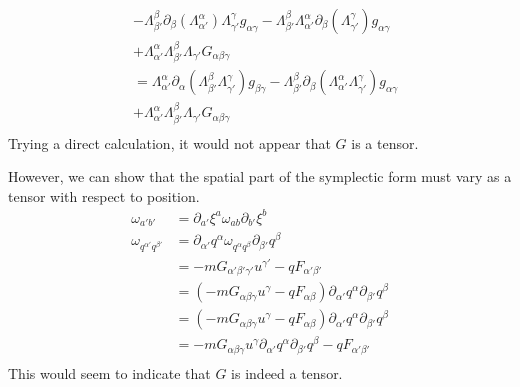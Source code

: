 \documentclass[11pt]{article}
\begin{document}
\begin{equation*}
\begin{aligned}
		&-\Lambda_{\beta'}^{\beta}\partial_{\beta}\left(\Lambda_{\alpha'}^{\alpha}\right)\Lambda_{\gamma'}^{\gamma}g_{\alpha\gamma} - \Lambda_{\beta'}^{\beta}\Lambda_{\alpha'}^{\alpha}\partial_{\beta}\left(\Lambda_{\gamma'}^{\gamma}\right)g_{\alpha\gamma}\\
		&+\Lambda_{\alpha'}^{\alpha}\Lambda_{\beta'}^{\beta}\Lambda_{\gamma'} G_{\alpha\beta\gamma} \\
		&=\Lambda_{\alpha'}^{\alpha}\partial_{\alpha}\left(\Lambda_{\beta'}^{\beta}\Lambda_{\gamma'}^{\gamma}\right)g_{\beta\gamma} -\Lambda_{\beta'}^{\beta}\partial_{\beta}\left(\Lambda_{\alpha'}^{\alpha}\Lambda_{\gamma'}^{\gamma}\right)g_{\alpha\gamma} \\
		&+\Lambda_{\alpha'}^{\alpha}\Lambda_{\beta'}^{\beta}\Lambda_{\gamma'} G_{\alpha\beta\gamma} \\
	\end{aligned}
\end{equation*}
Trying a direct calculation, it would not appear that $G$ is a tensor.

However, we can show that the spatial part of the symplectic form must
vary as a tensor with respect to position.
\begin{equation*}
	\begin{aligned}
		\omega_{a'b'} &= \partial_{a'}\xi^a \omega_{ab} \partial_{b'}\xi^b \\
		\omega_{q^{\alpha'}q^{\beta'}} &= \partial_{\alpha'}q^\alpha \omega_{q^{\alpha}q^{\beta}} \partial_{\beta'}q^\beta \\
		&=- m G_{\alpha'\beta'\gamma'} u^{\gamma'} - q F_{\alpha'\beta'} \\
		&= \left(- m G_{\alpha\beta\gamma} u^{\gamma} - q F_{\alpha\beta} \right) \partial_{\alpha'}q^\alpha \partial_{\beta'}q^\beta \\
		&= \left(- m G_{\alpha\beta\gamma} u^{\gamma} - q F_{\alpha\beta} \right) \partial_{\alpha'}q^\alpha \partial_{\beta'}q^\beta \\
		&= - m G_{\alpha\beta\gamma} u^{\gamma} \partial_{\alpha'}q^\alpha \partial_{\beta'}q^\beta - q F_{\alpha'\beta'}  \\
	\end{aligned}
\end{equation*}
This would seem to indicate that $G$ is indeed a tensor.


\begin{thebibliography}{0}
	
\end{thebibliography}
\end{document}

